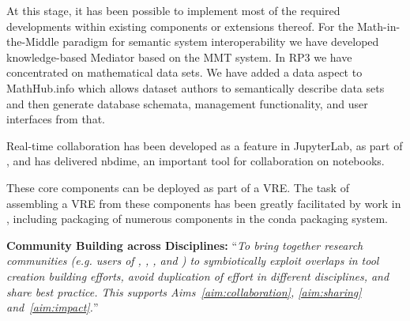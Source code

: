 \begin{compactenum}[\bf {Obj} 1\rm]
  At this stage, it has been possible to implement most of the required developments within
  existing components or extensions thereof. For the
  Math-in-the-Middle paradigm for semantic system interoperability we have developed
  knowledge-based Mediator based on the MMT system.
  In RP3 we have concentrated on mathematical data sets. We have added a data aspect to \textsf{MathHub.info} which allows dataset authors to semantically  describe data sets and then generate database schemata, management functionality, and user interfaces from that.

  Real-time collaboration has been developed as a feature in JupyterLab,
  as part of ,
  and  has delivered nbdime,
  an important tool for collaboration on \Jupyter notebooks.

  These core components can be deployed as part of a VRE.
  The task of assembling a VRE from these components
  has been greatly facilitated by work in ,
  including packaging of numerous \ODK components
  in the conda packaging system.


\item \label{objective:community}
  \textbf{Community Building across Disciplines:}
  ``\emph{To bring together research
    communities (e.g. users of \Jupyter, \Sage, \Singular, and \GAP) to
    symbiotically exploit overlaps in tool creation building efforts,
    avoid duplication of effort in different disciplines, and share best
    practice. This supports Aims~\ref{aim:collaboration},
    \ref{aim:sharing} and~\ref{aim:impact}.}''


\end{compactenum}
